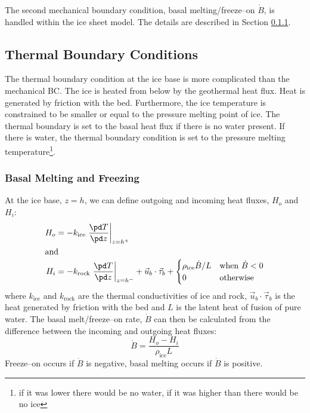 The second mechanical boundary condition, basal melting/freeze--on $\dot{B}$, is handled within the ice sheet model. The details are described in Section \ref{num.sec.bc_melt}.

\subsection{Thermal Boundary Conditions}
The thermal boundary condition at the ice base is more complicated than the mechanical BC. The ice is heated from below by the geothermal heat flux. Heat is generated by friction with the bed. Furthermore, the ice temperature is constrained to be smaller or equal to the pressure melting point of ice. The thermal boundary is set to the basal heat flux if there is no water present. If there is water, the thermal boundary condition is set to the pressure melting temperature\footnote{if it was lower there would be no water, if it was higher than there would be no ice}.

\subsubsection{Basal Melting and Freezing}\label{num.sec.bc_melt}
At the ice base, $z=h$, we can define outgoing and incoming heat fluxes, $H_o$ and $H_i$:
\begin{subequations}
  \begin{align}
    H_o&=-k_{\text{ice}}\left.\frac{\pd T}{\pd z}\right|_{z=h^+}\\
    \intertext{and}
    H_i&=-k_{\text{rock}}\left.\frac{\pd T}{\pd z}\right|_{z=h^-}+\vec{u}_b\cdot\vec{\tau}_b+
    \begin{cases}
      {\rho_{\text{ice}}\dot{B}}/{L} & \text{when $\dot{B}<0$} \\
      0 & \text{otherwise}
    \end{cases}
  \end{align}
\end{subequations}
where $k_{\text{ice}}$ and $k_{\text{rock}}$ are the thermal conductivities of ice and rock, $\vec{u}_b\cdot\vec{\tau}_b$ is the heat generated by friction with the bed and $L$ is the latent heat of fusion of pure water. The basal melt/freeze--on rate, $\dot{B}$ can then be calculated from the difference between the incoming and outgoing heat fluxes:
\begin{equation}
  \label{bc.eq.meltrate}
  \dot{B}=\frac{H_o-H_i}{\rho_{\text{ice}}L}
\end{equation}
Freeze--on occurs if $\dot{B}$ is negative, basal melting occurs if $\dot{B}$ is positive.


